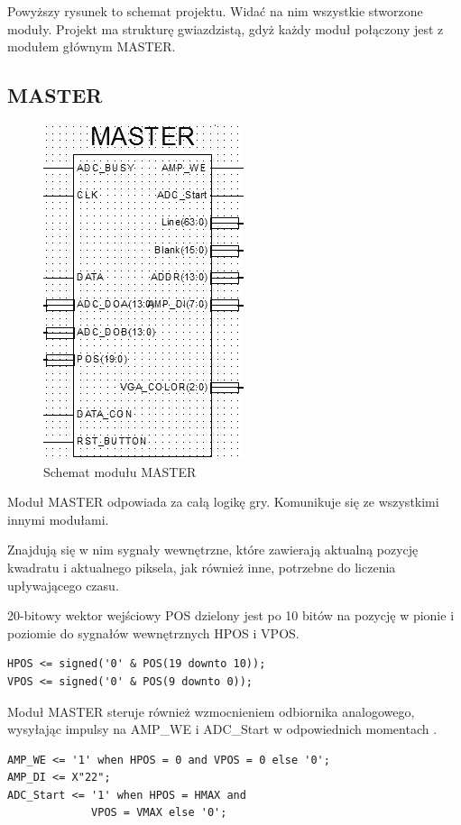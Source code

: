 \documentclass[11pt]{article}
\begin{document}
Powyższy rysunek to schemat projektu.
Widać na nim wszystkie stworzone moduły.
Projekt ma strukturę gwiazdzistą, gdyż każdy moduł połączony jest z modułem głównym MASTER.

\subsection{MASTER}

\begin{figure}[H]
\center
\includegraphics[scale=1]{MASTER.png}
\caption{Schemat modułu MASTER}
\end{figure}

\hspace*{0.55cm}Moduł MASTER odpowiada za całą logikę gry.
Komunikuje się ze wszystkimi innymi modułami.

Znajdują się w nim sygnały wewnętrzne, które zawierają aktualną pozycję kwadratu i aktualnego piksela, jak również inne, potrzebne do liczenia upływającego czasu.

20-bitowy wektor wejściowy POS dzielony jest po 10 bitów na pozycję w pionie i poziomie do sygnałów wewnętrznych HPOS i VPOS.
\newpage
\begin{lstlisting}[caption=Pobranie aktualnego adresu]
HPOS <= signed('0' & POS(19 downto 10));
VPOS <= signed('0' & POS(9 downto 0));
\end{lstlisting}

Moduł MASTER steruje również wzmocnieniem odbiornika analogowego, wysyłając impulsy na AMP\_WE i ADC\_Start w odpowiednich momentach \cite{pa}.

\begin{lstlisting}[caption=Sterowanie wzmocnieniem obiornika analogowo-cyfrowego]
AMP_WE <= '1' when HPOS = 0 and VPOS = 0 else '0';
AMP_DI <= X"22";
ADC_Start <= '1' when HPOS = HMAX and
             VPOS = VMAX else '0';
\end{lstlisting}
\end{document}
